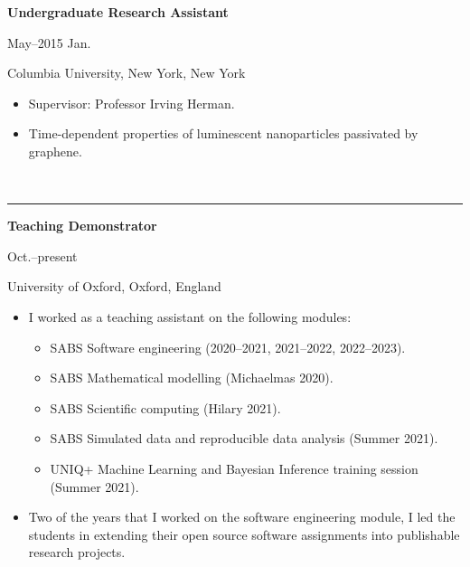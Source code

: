 \documentclass[11pt]{article}
\begin{document}
\noindent\parbox{.75\textwidth}{\raggedright \textbf{Undergraduate Research Assistant}}
\parbox{.25\textwidth}{ May--2015 Jan.}
Columbia University, New York, New York
\vspace{-.25cm}
\begin{itemize}
\item Supervisor: Professor Irving Herman.
\vspace{-.3cm}
\item Time-dependent properties of luminescent nanoparticles passivated by graphene.
\end{itemize}

\vspace{0.6cm}


\vspace{-2.75mm} \\
\rule{\textwidth}{0.4pt}
\vspace{0.1mm}
\noindent\parbox{.75\textwidth}{\raggedright \textbf{Teaching Demonstrator}}
\parbox{.25\textwidth}{ Oct.--present}
University of Oxford, Oxford, England
\vspace{-.25cm}
\begin{itemize}
\setlength{\itemsep}{4pt}
\setlength{\parskip}{0pt}
\setlength{\parsep}{0pt}
\item I worked as a teaching assistant on the following modules:
\begin{itemize}
\setlength{\itemsep}{0pt}
\item SABS Software engineering (2020--2021, 2021--2022, 2022--2023).
\item SABS Mathematical modelling (Michaelmas 2020).
\item SABS Scientific computing (Hilary 2021).
\item SABS Simulated data and reproducible data analysis (Summer 2021).
\item UNIQ+ Machine Learning and Bayesian Inference training session (Summer 2021).
\end{itemize}
\item Two of the years that I worked on the software engineering module, I led the students in extending their open source software assignments into publishable research projects.
\end{itemize}



\vspace{0.2cm}
\end{document}
